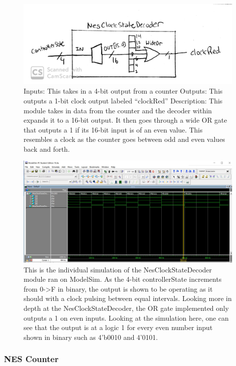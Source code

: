 \documentclass[a4paper]{article}
\begin{document}
\begin{figure}[H]
  \centering
    \includegraphics[width=.85\textwidth]{images/block_diagrams/nes/clock4.jpg}
	\caption{Inputs: This takes in a 4-bit output from a counter \newline
Outputs: This outputs a 1-bit clock output labeled “clockRed”
\newline
Description: This module takes in data from the counter and the decoder within expands it to a 16-bit output. It then goes through a wide OR gate that outputs a 1 if its 16-bit input is of an even value. This resembles a clock as the counter goes between odd and even values back and forth.}
    \label{fig:clock}
\end{figure}

\begin{figure}[H]
  \centering
    \includegraphics[width=.85\textwidth]{images/ModelSim/nesclock.JPG}
	\caption{This is the individual simulation of the NesClockStateDecoder module ran on ModelSim. As the 4-bit controllerState increments from 0->F in binary, the output is shown to be operating as it should with a clock pulsing between equal intervals. Looking more in depth at the NesClockStateDecoder, the OR gate implemented only outputs a 1 on even inputs. Looking at the simulation here, one can see that the output is at a logic 1 for every even number input shown in binary such as 4’b0010 and 4’0101.}
    \label{fig:clock_sim}
\end{figure}

\subsubsection{NES Counter}
\end{document}
